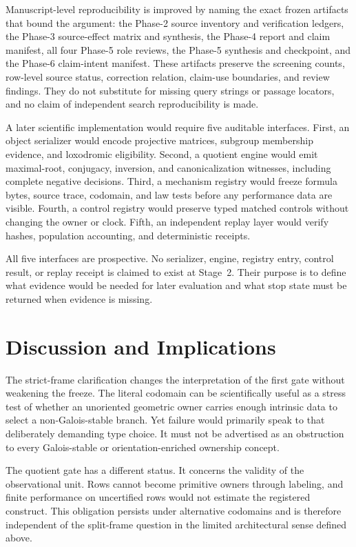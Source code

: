 \documentclass[11pt,a4paper]{article}
\begin{document}
Manuscript-level reproducibility is improved by naming the exact frozen artifacts that bound the argument: the Phase-2 source inventory and verification ledgers, the Phase-3 source-effect matrix and synthesis, the Phase-4 report and claim manifest, all four Phase-5 role reviews, the Phase-5 synthesis and checkpoint, and the Phase-6 claim-intent manifest. These artifacts preserve the screening counts, row-level source status, correction relation, claim-use boundaries, and review findings. They do not substitute for missing query strings or passage locators, and no claim of independent search reproducibility is made.

A later scientific implementation would require five auditable interfaces. First, an object serializer would encode projective matrices, subgroup membership evidence, and loxodromic eligibility. Second, a quotient engine would emit maximal-root, conjugacy, inversion, and canonicalization witnesses, including complete negative decisions. Third, a mechanism registry would freeze formula bytes, source trace, codomain, and law tests before any performance data are visible. Fourth, a control registry would preserve typed matched controls without changing the owner or clock. Fifth, an independent replay layer would verify hashes, population accounting, and deterministic receipts.

All five interfaces are prospective. No serializer, engine, registry entry, control result, or replay receipt is claimed to exist at Stage~2. Their purpose is to define what evidence would be needed for later evaluation and what stop state must be returned when evidence is missing.

\section{Discussion and Implications}

The strict-frame clarification changes the interpretation of the first gate without weakening the freeze. The literal codomain can be scientifically useful as a stress test of whether an unoriented geometric owner carries enough intrinsic data to select a non-Galois-stable branch. Yet failure would primarily speak to that deliberately demanding type choice. It must not be advertised as an obstruction to every Galois-stable or orientation-enriched ownership concept.

The quotient gate has a different status. It concerns the validity of the observational unit. Rows cannot become primitive owners through labeling, and finite performance on uncertified rows would not estimate the registered construct. This obligation persists under alternative codomains and is therefore independent of the split-frame question in the limited architectural sense defined above.
\end{document}
